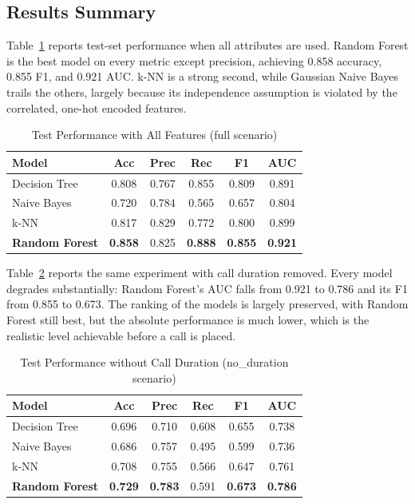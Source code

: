 \documentclass[conference]{IEEEtran}
\begin{document}
	\subsection{Results Summary}
	Table~\ref{tab:full} reports test-set performance when all attributes are used.
	Random Forest is the best model on every metric except precision, achieving
	0.858 accuracy, 0.855 F1, and 0.921 AUC. k-NN is a strong second, while
	Gaussian Naive Bayes trails the others, largely because its independence
	assumption is violated by the correlated, one-hot encoded features.

	\begin{table}[htbp]
		\caption{Test Performance with All Features (full scenario)}
		\begin{center}
			\begin{tabular}{|l|c|c|c|c|c|}
				\hline
				\textbf{Model} & \textbf{Acc} & \textbf{Prec} & \textbf{Rec} & \textbf{F1} & \textbf{AUC} \\
				\hline
				Decision Tree & 0.808 & 0.767 & 0.855 & 0.809 & 0.891 \\ \hline
				Naive Bayes & 0.720 & 0.784 & 0.565 & 0.657 & 0.804 \\ \hline
				k-NN & 0.817 & 0.829 & 0.772 & 0.800 & 0.899 \\ \hline
				\textbf{Random Forest} & \textbf{0.858} & 0.825 & \textbf{0.888} & \textbf{0.855} & \textbf{0.921} \\ \hline
			\end{tabular}
			\label{tab:full}
		\end{center}
	\end{table}

	Table~\ref{tab:nodur} reports the same experiment with call duration removed.
	Every model degrades substantially: Random Forest's AUC falls from 0.921 to
	0.786 and its F1 from 0.855 to 0.673. The ranking of the models is largely
	preserved, with Random Forest still best, but the absolute performance is much
	lower, which is the realistic level achievable before a call is placed.

	\begin{table}[htbp]
		\caption{Test Performance without Call Duration (no\_duration scenario)}
		\begin{center}
			\begin{tabular}{|l|c|c|c|c|c|}
				\hline
				\textbf{Model} & \textbf{Acc} & \textbf{Prec} & \textbf{Rec} & \textbf{F1} & \textbf{AUC} \\
				\hline
				Decision Tree & 0.696 & 0.710 & 0.608 & 0.655 & 0.738 \\ \hline
				Naive Bayes & 0.686 & 0.757 & 0.495 & 0.599 & 0.736 \\ \hline
				k-NN & 0.708 & 0.755 & 0.566 & 0.647 & 0.761 \\ \hline
				\textbf{Random Forest} & \textbf{0.729} & \textbf{0.783} & 0.591 & \textbf{0.673} & \textbf{0.786} \\ \hline
			\end{tabular}
			\label{tab:nodur}
		\end{center}
	\end{table}
\end{document}
